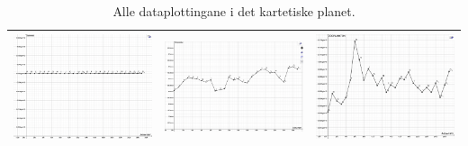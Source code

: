 \documentclass{report}
\begin{document}
\begin{table}[H]
\begin{tabular}{|l|l|l|}
    \hline
    \includegraphics[scale=0.133]{Bileter/Salt.png}& \includegraphics[scale=0.133]{Bileter/Temp.png} & \includegraphics[scale=0.133]{Bileter/ZooPlankton.png}  \\
    \hline
    \end{tabular}
    \caption{Alle dataplottingane i det kartetiske planet.}
    \label{F3}
\end{table}
\end{document}
